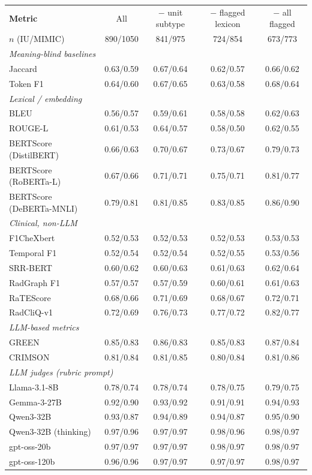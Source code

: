 \begin{tabular}{lcccc}
\toprule
\textbf{Metric} & All & $-$ unit subtype & $-$ flagged lexicon & $-$ all flagged \\
$n$ (IU/MIMIC) & 890/1050 & 841/975 & 724/854 & 673/773 \\
\midrule
\multicolumn{5}{l}{\textit{Meaning-blind baselines}} \\
Jaccard & 0.63/0.59 & 0.67/0.64 & 0.62/0.57 & 0.66/0.62 \\
Token F1 & 0.64/0.60 & 0.67/0.65 & 0.63/0.58 & 0.68/0.64 \\
\multicolumn{5}{l}{\textit{Lexical / embedding}} \\
BLEU & 0.56/0.57 & 0.59/0.61 & 0.58/0.58 & 0.62/0.63 \\
ROUGE-L & 0.61/0.53 & 0.64/0.57 & 0.58/0.50 & 0.62/0.55 \\
BERTScore (DistilBERT) & 0.66/0.63 & 0.70/0.67 & 0.73/0.67 & 0.79/0.73 \\
BERTScore (RoBERTa-L) & 0.67/0.66 & 0.71/0.71 & 0.75/0.71 & 0.81/0.77 \\
BERTScore (DeBERTa-MNLI) & 0.79/0.81 & 0.81/0.85 & 0.83/0.85 & 0.86/0.90 \\
\multicolumn{5}{l}{\textit{Clinical, non-LLM}} \\
F1CheXbert & 0.52/0.53 & 0.52/0.53 & 0.52/0.53 & 0.53/0.53 \\
Temporal F1 & 0.52/0.54 & 0.52/0.54 & 0.52/0.55 & 0.53/0.56 \\
SRR-BERT & 0.60/0.62 & 0.60/0.63 & 0.61/0.63 & 0.62/0.64 \\
RadGraph F1 & 0.57/0.57 & 0.57/0.59 & 0.60/0.61 & 0.61/0.63 \\
RaTEScore & 0.68/0.66 & 0.71/0.69 & 0.68/0.67 & 0.72/0.71 \\
RadCliQ-v1 & 0.72/0.69 & 0.76/0.73 & 0.77/0.72 & 0.82/0.77 \\
\multicolumn{5}{l}{\textit{LLM-based metrics}} \\
GREEN & 0.85/0.83 & 0.86/0.83 & 0.85/0.83 & 0.87/0.84 \\
CRIMSON & 0.81/0.84 & 0.81/0.85 & 0.80/0.84 & 0.81/0.86 \\
\multicolumn{5}{l}{\textit{LLM judges (rubric prompt)}} \\
Llama-3.1-8B & 0.78/0.74 & 0.78/0.74 & 0.78/0.75 & 0.79/0.75 \\
Gemma-3-27B & 0.92/0.90 & 0.93/0.92 & 0.91/0.91 & 0.94/0.93 \\
Qwen3-32B & 0.93/0.87 & 0.94/0.89 & 0.94/0.87 & 0.95/0.90 \\
Qwen3-32B (thinking) & 0.97/0.96 & 0.97/0.97 & 0.98/0.96 & 0.98/0.97 \\
gpt-oss-20b & 0.97/0.97 & 0.97/0.97 & 0.98/0.97 & 0.98/0.97 \\
gpt-oss-120b & 0.96/0.96 & 0.97/0.97 & 0.97/0.97 & 0.98/0.97 \\
\bottomrule
\end{tabular}
